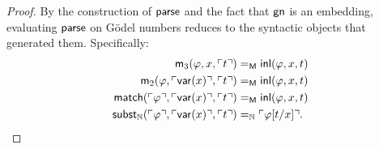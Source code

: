\begin{proof}
    By the construction of $\mathsf{parse}$ and the fact that $\mathsf{gn}$ is an embedding, evaluating $\mathsf{parse}$ on G\"odel numbers reduces to the syntactic objects that generated them. Specifically:
    \begin{align*}
        \mathsf{m}_3(\varphi,x,\ulcorner t\urcorner)
            &\mathrel{=_{\mathsf{M}}}\mathsf{inl}(\varphi,x,t)\\
        \mathsf{m}_2(\varphi,\ulcorner\mathsf{var}(x)\urcorner,\ulcorner t\urcorner)
            &\mathrel{=_{\mathsf{M}}}\mathsf{inl}(\varphi,x,t)\\
        \mathsf{match}(\ulcorner\varphi\urcorner,\ulcorner\mathsf{var}(x)\urcorner,\ulcorner t\urcorner)
            &\mathrel{=_{\mathsf{M}}}\mathsf{inl}(\varphi,x,t)\\
        \mathsf{subst}_{\mathbb{N}}(\ulcorner\varphi\urcorner,\ulcorner\mathsf{var}(x)\urcorner,\ulcorner t\urcorner)
            &\mathrel{=_{\mathbb{N}}}\ulcorner\varphi[t/x]\urcorner.
    \end{align*}
\end{proof}